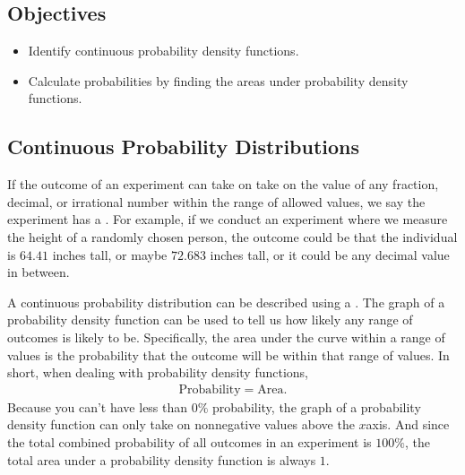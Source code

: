 \documentclass[letterpaper,10pt,english]{jupyterBook}
\begin{document}
\subsection{Objectives}
\label{\detokenize{Ch3 Probability/3.7 Continuous Probability Distributions:objectives}}\begin{itemize}
\item {} 
\sphinxAtStartPar
Identify continuous probability density functions.

\item {} 
\sphinxAtStartPar
Calculate probabilities by finding the areas under probability density functions.

\end{itemize}


\subsection{Continuous Probability Distributions}
\label{\detokenize{Ch3 Probability/3.7 Continuous Probability Distributions:id1}}
\sphinxAtStartPar
If the outcome of an experiment can take on take on the value of any fraction, decimal, or irrational number within the range of allowed values, we say the experiment has a . For example, if we conduct an experiment where we measure the height of a randomly chosen person, the outcome could be that the individual is \(64.41\) inches tall, or maybe \(72.683\) inches tall, or it could be any decimal value in between.

\sphinxAtStartPar
A continuous probability distribution can be described using a . The graph of a probability density function can be used to tell us how likely any range of outcomes is likely to be. Specifically, the area under the curve within a range of values is the probability that the outcome will be within that range of values. In short, when dealing with probability density functions,
\begin{equation*}
\begin{split}\text{Probability} = \text{Area}. \end{split}
\end{equation*}
\sphinxAtStartPar
Because you can’t have less than \(0\%\) probability, the graph of a probability density function can only take on non\sphinxhyphen{}negative values above the \(x\)\sphinxhyphen{}axis. And since the total combined probability of all outcomes in an experiment is \(100\%\), the total area under a probability density function is always \(1\).
\end{document}
